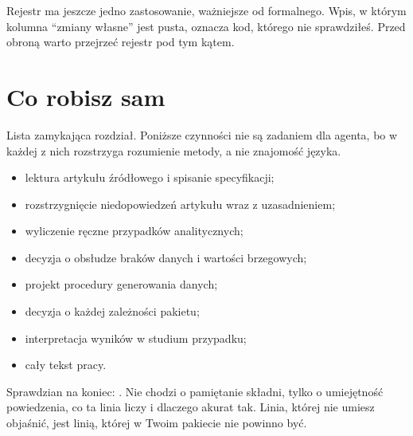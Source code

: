 Rejestr ma jeszcze jedno zastosowanie, ważniejsze od formalnego. Wpis, w którym kolumna \enquote{zmiany własne} jest pusta, oznacza kod, którego nie sprawdziłeś. Przed obroną warto przejrzeć rejestr pod tym kątem.

\section{Co robisz sam}

Lista zamykająca rozdział. Poniższe czynności nie są zadaniem dla agenta, bo w każdej z nich rozstrzyga rozumienie metody, a nie znajomość języka.

\begin{itemize}
  \item lektura artykułu źródłowego i spisanie specyfikacji;
  \item rozstrzygnięcie niedopowiedzeń artykułu wraz z uzasadnieniem;
  \item wyliczenie ręczne przypadków analitycznych;
  \item decyzja o obsłudze braków danych i wartości brzegowych;
  \item projekt procedury generowania danych;
  \item decyzja o każdej zależności pakietu;
  \item interpretacja wyników w studium przypadku;
  \item cały tekst pracy.
\end{itemize}

Sprawdzian na koniec: . Nie chodzi o pamiętanie składni, tylko o umiejętność powiedzenia, co ta linia liczy i dlaczego akurat tak. Linia, której nie umiesz objaśnić, jest linią, której w Twoim pakiecie nie powinno być.
